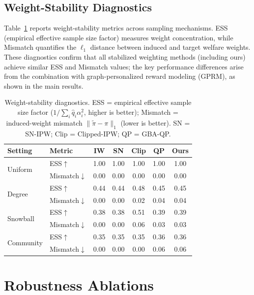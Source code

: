 \documentclass{article}
\theoremstyle{plain}
\theoremstyle{definition}
\theoremstyle{remark}
\begin{document}
\subsection{Weight-Stability Diagnostics}
\label{app:weight-diagnostics}

Table~\ref{tab:weight-diagnostics} reports weight-stability metrics across sampling mechanisms.
ESS (empirical effective sample size factor) measures weight concentration, while Mismatch
quantifies the $\ell_1$ distance between induced and target welfare weights. These diagnostics
confirm that all stabilized weighting methods (including ours) achieve similar ESS and Mismatch
values; the key performance differences arise from the combination with graph-personalized
reward modeling (GPRM), as shown in the main results.

\begin{table}[h]
\caption{Weight-stability diagnostics. ESS = empirical effective sample size factor ($1/\sum_i \hat q_i \alpha_i^2$, higher is better); Mismatch = induced-weight mismatch $\|\tilde\pi-\pi\|_1$ (lower is better). SN = SN-IPW; Clip = Clipped-IPW; QP = GBA-QP.}
\label{tab:weight-diagnostics}
\centering
\small
\begin{tabular}{llccccc}
\toprule
\textbf{Setting} & \textbf{Metric} & \textbf{IW} & \textbf{SN} & \textbf{Clip} & \textbf{QP} & \textbf{Ours} \\
\midrule
\multirow{2}{*}{Uniform}
& ESS$\uparrow$ & 1.00 & 1.00 & 1.00 & 1.00 & 1.00 \\
& Mismatch$\downarrow$ & 0.00 & 0.00 & 0.00 & 0.00 & 0.00 \\
\midrule
\multirow{2}{*}{Degree}
& ESS$\uparrow$ & 0.44 & 0.44 & 0.48 & 0.45 & 0.45 \\
& Mismatch$\downarrow$ & 0.00 & 0.00 & 0.02 & 0.04 & 0.04 \\
\midrule
\multirow{2}{*}{Snowball}
& ESS$\uparrow$ & 0.38 & 0.38 & 0.51 & 0.39 & 0.39 \\
& Mismatch$\downarrow$ & 0.00 & 0.00 & 0.06 & 0.03 & 0.03 \\
\midrule
\multirow{2}{*}{Community}
& ESS$\uparrow$ & 0.35 & 0.35 & 0.35 & 0.36 & 0.36 \\
& Mismatch$\downarrow$ & 0.00 & 0.00 & 0.00 & 0.06 & 0.06 \\
\bottomrule
\end{tabular}
\end{table}


\section{Robustness Ablations}
\label{app:robustness}
\end{document}
